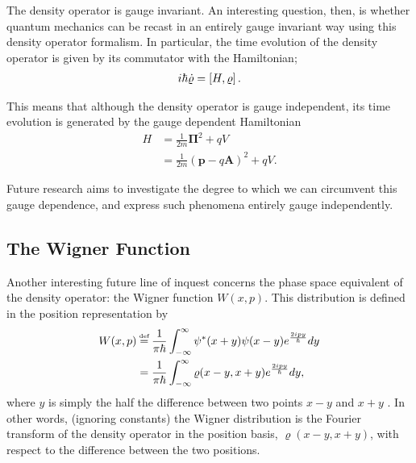 The density operator is gauge invariant. An interesting question, then, is
whether quantum mechanics can be recast in an entirely gauge invariant way using
this density operator formalism. In particular, the time evolution of the
density operator is given by its commutator with the Hamiltonian;
\begin{align}
    i \hbar \dot{\varrho} = \left[ H , \varrho \right].
\end{align}

This means that although the density operator is gauge independent, its time
evolution is generated by the gauge dependent Hamiltonian
\begin{align}
    H &= \frac{1}{2m} \mathbf{\Pi}^2 + qV \\
      &= \frac{1}{2m} \left( \mathbf{p} - q \mathbf{A} \right)^2 + qV.
\end{align}

Future research aims to investigate the degree to which we can circumvent this
gauge dependence, and express such phenomena entirely gauge independently.

\subsection{The Wigner Function}

Another interesting future line of inquest concerns the phase space equivalent
of the density operator: the Wigner function $W(x,p)$. This distribution is
defined in the position representation by
\begin{align}
    W(x,p) &\defeq \frac{1}{\pi \hbar} \int_{-\infty}^{\infty} \psi^*(x+y)
    \psi(x-y) e^{\frac{2ipy}{\hbar}} dy \\
    &= \frac{1}{\pi \hbar} \int_{-\infty}^{\infty} \varrho(x-y,x+y)
    e^{\frac{2ipy}{\hbar}} dy,
\end{align}
where $y$ is simply the half the difference between two points $x - y$ and $x +
y$ \cite{wigner}. In other words, (ignoring constants) the Wigner distribution is the Fourier
transform of the density operator in the position basis, $\varrho(x-y,x+y)$,
with respect to the difference between the two positions.

